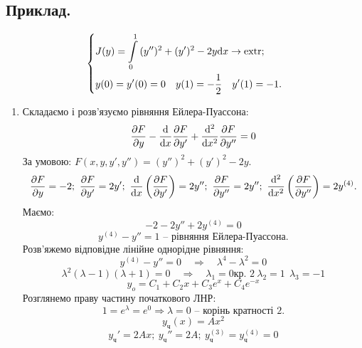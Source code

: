 \subsection*{Приклад.}
$$
\begin{dcases}
 J(y) =  \int\limits_{0}^{1}{ (y'')^2 + (y')^2 - 2 y  \mathrm{d} x } \to \mathrm{extr};\\
 y(0) = y' (0) = 0 \quad y(1) = - \frac{1}{2} \quad y'(1) = -1 .
\end{dcases}
$$
\begin{enumerate}
  \item Складаємо і розв'язуємо рівняння Ейлера-Пуассона:
  $$
  \frac{\partial F}{\partial y} - \frac{\mathrm{d}}{\mathrm{d} x} \frac{\partial F}{\partial y'} + \frac{\mathrm{d}^2}{ \mathrm{d} x ^2} \frac{\partial F}{\partial y''} = 0
  $$
  За умовою: $ F(x, y, y', y'') = (y'')^2 + (y' )^2 - 2y$.
  $$
  \frac{
  \partial F
  }{
\partial y
  } = -2 ; \  \frac{\partial F}{\partial y'} = 2 y' ; \  \frac{\mathrm{d}}{\mathrm{d} x} \left( \frac{\partial F}{
  \partial y'
  }  \right)  = 2 y'' ; \  \frac{\partial F}{\partial y''
  }  = 2y''; \  \frac{\mathrm{d}^2}{ \mathrm{d} x^2} \left( \frac{\partial F}{\partial y''}  \right)  = 2 y^{(4)}.
  $$
Маємо:
$$
-2 - 2 y'' + 2 y^{(4)} = 0
$$
$$
y^{(4)} - y'' = 1 \text{ -- рівняння Ейлера-Пуассона.}
$$
Розв'яжемо відповідне лінійне однорідне рівняння:
$$
y^{(4)} - y'' = 0
\quad \Longrightarrow \quad \lambda^4 - \lambda^2 = 0
$$
$$
\lambda^2 (\lambda-1) (\lambda+1 ) = 0 \quad \Longrightarrow \quad \lambda_1 = 0 \text{кр. 2} \
\lambda_2 = 1 \ \ \lambda_3 = -1
$$
$$
y_o = C_1 + C_2x + C_3 e^x + C_4 e^{-x}
$$
Розглянемо праву частину початкового ЛНР:
$$
1 = e^{\lambda} = e^0  \Longrightarrow \lambda = 0 \text{ -- корінь кратності 2.}
$$
$$
y_{\text{ч}} (x) = Ax^2
$$
$$
y_{\text{ч}}' = 2Ax ; \  y_{\text{ч}}'' = 2 A ; \  y_{\text{ч}}^{(3)} = y_{\text{ч}}^{(4)} = 0
$$
\end{enumerate}
